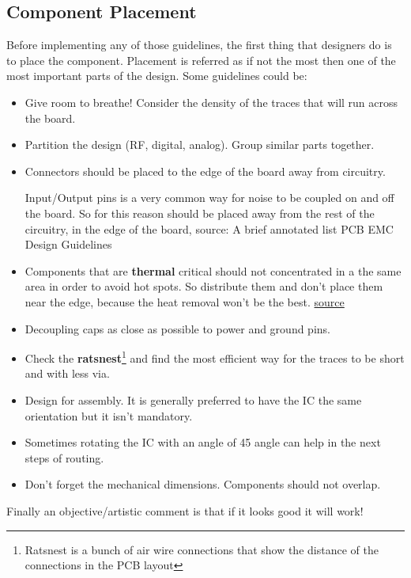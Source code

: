 \documentclass[final]{cubedoc}
\begin{document}
	\subsection{Component Placement}
	
	Before implementing any of those guidelines, the first thing that designers do is to place the component. Placement is referred as if not the most then one of the most important parts of the design. Some guidelines could be:
	
	\begin{itemize}
		\item Give room to breathe! Consider the density of the traces that will run across the board.
		\item Partition the design (RF, digital, analog). Group similar parts together.
		\item Connectors should be placed to the edge of the board away from circuitry.
		
		Input/Output pins is a very common way for noise to be coupled on and off the board. So for this reason should be placed away from the rest of the circuitry, in the edge of the board, source: A brief annotated list PCB EMC Design Guidelines
		
		\item Components that are \textbf{thermal} critical should not concentrated in a the same area in order to avoid hot spots. So distribute them and don't place them near the edge, because the heat removal won't be the best. \href{https://www.allaboutcircuits.com/technical-articles/pcb-thermal-management-techniques/}{source}
		
		\item Decoupling caps as close as possible to power and ground pins.
		\item Check the \textbf{ratsnest}\footnote{Ratsnest is a bunch of air wire connections that show the distance of the connections in the PCB layout} and find the most efficient way for the traces to be short and with less via.
		\item Design for assembly. It is generally preferred to have the IC the same orientation but it isn't mandatory.
		\item Sometimes rotating the IC with an angle of 45 angle can help in the next steps of routing.
		\item Don't forget the mechanical dimensions. Components should not overlap.
	\end{itemize}
	
	Finally an objective/artistic comment is that if it looks good it will work!
	
\end{document}
